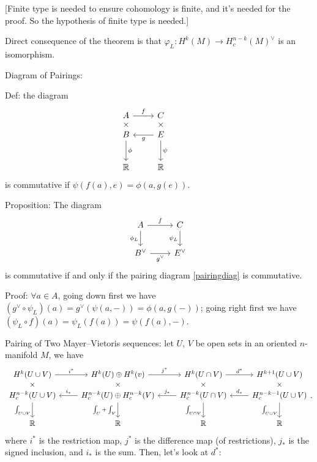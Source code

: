 \documentclass{article}
\theoremstyle{mystyle}
\theoremstyle{remark}
\numberwithin{equation}{section}
\begin{document}
[Finite type is needed to ensure cohomology is finite, and it's needed for the proof. So the hypothesis of finite type is needed.]

Direct consequence of the theorem is that $\varphi_L\colon H^k(M)\rightarrow H^{n-k}_c(M)^\vee$ is an isomorphism.

Diagram of Pairings:

Def: the diagram 
\begin{equation}\label{pairingdiag}
\begin{tikzcd}[row sep = -0.1cm]
A\ar[r,"f"]&C\\ \times & \times \\ B\ar[ddddddd,"\phi"] & \ar[l,"g"]\ar[ddddddd,"\psi"]  E\\
~&&~\\~&&~\\~&&~\\~&&~\\~&&~\\~&&~\\ \mathbb{R} & \mathbb{R}
\end{tikzcd}
\end{equation}
is commutative if
$\psi(f(a),e) = \phi(a,g(e))$.




Proposition: The diagram 
$$
\begin{tikzcd}
A\ar[r,"f"]\ar[d,"\phi_L"']&C\ar[d,"\psi_L"']\\
B^\vee\ar[r,"g^\vee"'] & E^\vee
\end{tikzcd}
$$
is commutative if and only if the pairing diagram \eqref{pairingdiag} is commutative.

Proof: $\forall a \in A$, going down first we have $(g^\vee\circ \psi_L)(a) = g^\vee(\psi(a,-)) = \phi(a,g(-))$; going right first we have $(\psi_L\circ f)(a) = \psi_L(f(a))=\psi(f(a),-)$.

Pairing of Two Mayer--Vietoris sequences: let $U$, $V$ be open sets in an oriented $n$-manifold $M$, 
we have
\begin{equation}\label{MVmv}
\begin{tikzcd}[row sep = -0.1cm]
H^k(U\cup V)\ar[r,"i^*"] &H^k(U)\oplus H^k(v)\ar[r,"j^*"] & H^k(U\cap V)\ar[r,"d^*"] & H^{k+1}(U\cup V)\\
\times & \times & \times & \times \\
H^{n-k}_c(U\cup V)\ar[dddddd,"\int_{U\cup V}"']&\ar[l,"i_*"']H^{n-k}_c(U)\oplus H^{n-k}_c(V) \ar[dddddd,"\int_U+\int_V"']&\ar[l,"j_*"'] H^{n-k}_c(U\cap V)\ar[dddddd,"\int_{U\cap V}"'] &\ar[l,"d_*"'] H^{n-k-1}_c(U\cup V) \ar[dddddd,"\int_{U\cup V}"']\\
~&~&~&~\\~&~&~&~\\~&~&~&~\\~&~&~&~\\~&~&~&~\\
\mathbb{R}&\mathbb{R}&\mathbb{R}&\mathbb{R}
\end{tikzcd}.
\end{equation}
where $i^*$ is the restriction map, $j^*$ is the difference map (of restrictions), $j_*$ is the signed inclusion, and $i_*$ is the sum. Then, let's look at $d^*$:
\end{document}
